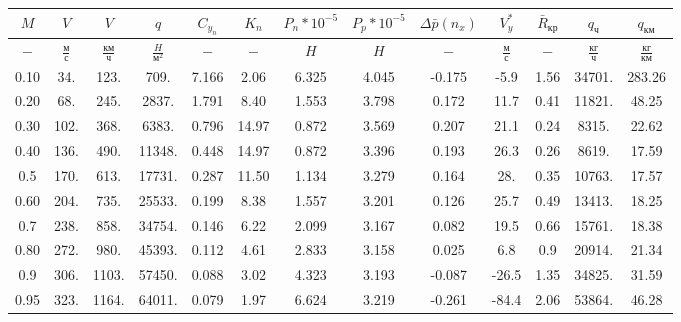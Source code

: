 \begin{tabular}{|c|c|c|c|c|c|c|c|c|c|c|c|c|}
\hline
$M$ & $V$ & $V$ & $q$ & $C_{y_n}$ & $K_n$ & $P_n*10^{-5}$ & $P_p*10^{-5}$ & $\Delta \bar{p}(n_x)$ & $V_y^*$ & $\bar{R}_{кр}$ & $q_{ч}$ & $q_{км}$ \\ 
\hline
$-$ & $\frac{м}{с}$ & $\frac{км}{ч}$ & $\frac{H}{м^2}$ & $-$ & $-$ & $H$ & $H$ & $-$ & $\frac{м}{с}$ & $-$ & $\frac{кг}{ч}$ & $\frac{кг}{км}$ \\ 
\hline
0.10 & 34. & 123. & 709. & 7.166 & 2.06 & 6.325 & 4.045 & -0.175 & -5.9 & 1.56 & 34701. & 283.26 \\ 
\hline
0.20 & 68. & 245. & 2837. & 1.791 & 8.40 & 1.553 & 3.798 & 0.172 & 11.7 & 0.41 & 11821. & 48.25 \\ 
\hline
0.30 & 102. & 368. & 6383. & 0.796 & 14.97 & 0.872 & 3.569 & 0.207 & 21.1 & 0.24 & 8315. & 22.62 \\ 
\hline
0.40 & 136. & 490. & 11348. & 0.448 & 14.97 & 0.872 & 3.396 & 0.193 & 26.3 & 0.26 & 8619. & 17.59 \\ 
\hline
0.5 & 170. & 613. & 17731. & 0.287 & 11.50 & 1.134 & 3.279 & 0.164 & 28. & 0.35 & 10763. & 17.57 \\ 
\hline
0.60 & 204. & 735. & 25533. & 0.199 & 8.38 & 1.557 & 3.201 & 0.126 & 25.7 & 0.49 & 13413. & 18.25 \\ 
\hline
0.7 & 238. & 858. & 34754. & 0.146 & 6.22 & 2.099 & 3.167 & 0.082 & 19.5 & 0.66 & 15761. & 18.38 \\ 
\hline
0.80 & 272. & 980. & 45393. & 0.112 & 4.61 & 2.833 & 3.158 & 0.025 & 6.8 & 0.9 & 20914. & 21.34 \\ 
\hline
0.9 & 306. & 1103. & 57450. & 0.088 & 3.02 & 4.323 & 3.193 & -0.087 & -26.5 & 1.35 & 34825. & 31.59 \\ 
\hline
0.95 & 323. & 1164. & 64011. & 0.079 & 1.97 & 6.624 & 3.219 & -0.261 & -84.4 & 2.06 & 53864. & 46.28 \\ 
\hline
\end{tabular}